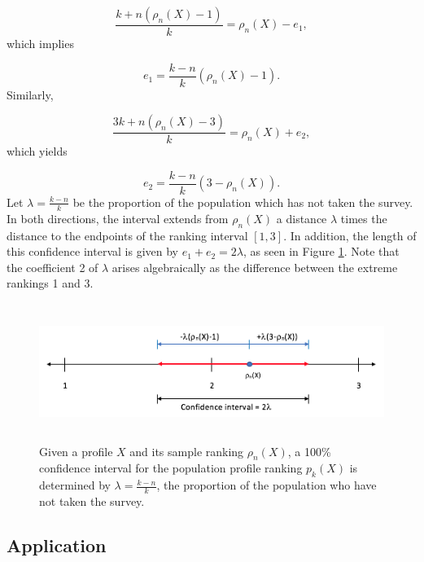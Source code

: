 \documentclass[a4paper, 12pt]{article}
\begin{document}
\begin{equation}
\frac{k+n(\rho_n(X)-1)}{k} = \rho_n(X)-e_1,
\end{equation}
\label{eq:10}
{\flushleft which implies}

\begin{equation}
e_1 = \frac{k-n}{k}(\rho_n(X)-1).
\end{equation}
\label{eq:11}
{\flushleft Similarly,}

\begin{equation}
\frac{3k+n(\rho_n(X)-3)}{k} = \rho_n(X)+e_2,
\end{equation}
\label{eq:12}
{\flushleft which} yields

\begin{equation}
e_2=\frac{k-n}{k}(3-\rho_n(X)).
\end{equation}
\label{eq:13}
{\flushleft Let} $\lambda=\frac{k-n}{k}$ be the proportion of the population which has not taken the survey. In both directions, the interval extends from $\rho_n(X)$ a distance $\lambda$ times the distance to the endpoints of the ranking interval $[1, 3]$. In addition, the length of this confidence interval is given by  $e_1+e_2=2\lambda$, as seen in Figure \ref{AL}. Note that the coefficient 2 of $\lambda$ arises algebraically as the difference between  the extreme rankings 1 and 3.

\begin{figure}[!htpb]
\centering
\includegraphics[width=6.5in, height=1.75in]{Confidence_Interval.png}
\caption{Given a profile $X$ and its sample ranking $\rho_n(X)$, a 100\% confidence interval for the population profile ranking $p_k(X)$ is determined by $\lambda=\frac{k-n}{k}$, the proportion of the population who have not taken the survey.}
\label{AL}
\end{figure}


\subsection{Application}
\end{document}
